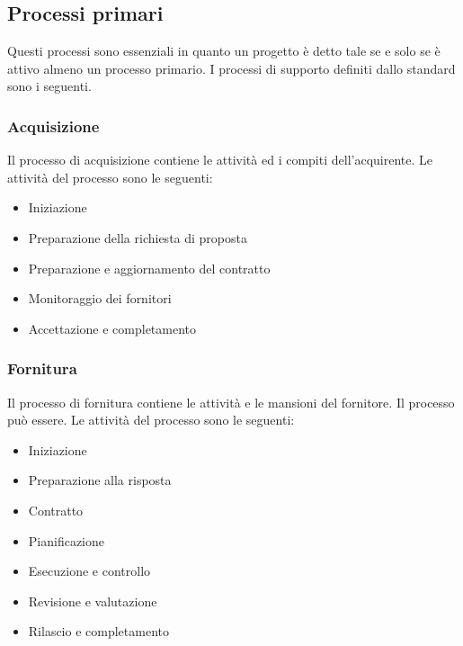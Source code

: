 \subsection{Processi primari}
Questi processi sono essenziali in quanto un progetto è detto tale se e solo se è attivo almeno un processo primario.
I processi di supporto definiti dallo standard sono i seguenti.
\subsubsection{Acquisizione}
Il processo di acquisizione contiene le attività ed i compiti dell'acquirente.
Le attività del processo sono le seguenti:
\begin{itemize}
\item Iniziazione
\item Preparazione della richiesta di proposta
\item Preparazione e aggiornamento del contratto
\item Monitoraggio dei fornitori
\item Accettazione e completamento
\end{itemize}

\subsubsection{Fornitura}
Il processo di fornitura contiene le attività e le mansioni del fornitore. Il processo può essere.
Le attività del processo sono le seguenti:
\begin{itemize}
\item Iniziazione
\item Preparazione alla risposta
\item Contratto
\item Pianificazione
\item Esecuzione e controllo
\item Revisione e valutazione
\item Rilascio e completamento
\end{itemize}

